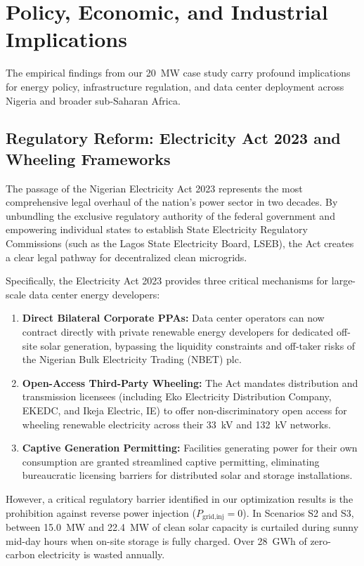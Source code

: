 \documentclass[11pt,a4paper]{article}
\begin{document}
\section{Policy, Economic, and Industrial Implications}
\label{sec:policy}

The empirical findings from our 20~MW case study carry profound implications for energy policy, infrastructure regulation, and data center deployment across Nigeria and broader sub-Saharan Africa.

\subsection{Regulatory Reform: Electricity Act 2023 and Wheeling Frameworks}
\label{subsec:policy_electricity_act}

The passage of the Nigerian Electricity Act 2023 represents the most comprehensive legal overhaul of the nation's power sector in two decades. By unbundling the exclusive regulatory authority of the federal government and empowering individual states to establish State Electricity Regulatory Commissions (such as the Lagos State Electricity Board, LSEB), the Act creates a clear legal pathway for decentralized clean microgrids.

Specifically, the Electricity Act 2023 provides three critical mechanisms for large-scale data center energy developers:
\begin{enumerate}
    \item \textbf{Direct Bilateral Corporate PPAs:} Data center operators can now contract directly with private renewable energy developers for dedicated off-site solar generation, bypassing the liquidity constraints and off-taker risks of the Nigerian Bulk Electricity Trading (NBET) plc.
    \item \textbf{Open-Access Third-Party Wheeling:} The Act mandates distribution and transmission licensees (including Eko Electricity Distribution Company, EKEDC, and Ikeja Electric, IE) to offer non-discriminatory open access for wheeling renewable electricity across their 33~kV and 132~kV networks.
    \item \textbf{Captive Generation Permitting:} Facilities generating power for their own consumption are granted streamlined captive permitting, eliminating bureaucratic licensing barriers for distributed solar and storage installations.
\end{enumerate}

However, a critical regulatory barrier identified in our optimization results is the prohibition against reverse power injection ($P_{\text{grid,inj}} = 0$). In Scenarios S2 and S3, between 15.0~MW and 22.4~MW of clean solar capacity is curtailed during sunny mid-day hours when on-site storage is fully charged. Over 28~GWh of zero-carbon electricity is wasted annually. 
\end{document}
